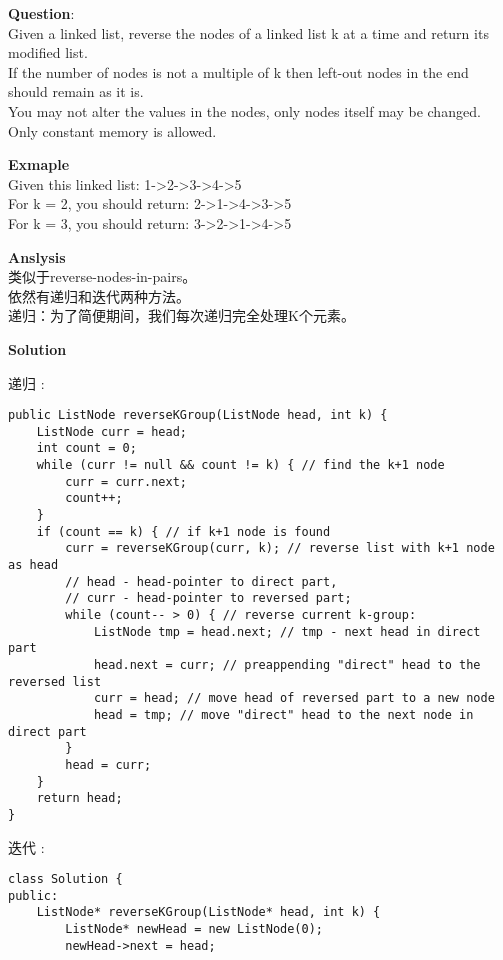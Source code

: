     
\begin{description}
    \item{\textbf{Question}}:\\%
		Given a linked list, reverse the nodes of a linked list k at a time and return its modified list.\\
		If the number of nodes is not a multiple of k then left-out nodes in the end should remain as it is.\\
		You may not alter the values in the nodes, only nodes itself may be changed.\\
		Only constant memory is allowed.

    \item{\textbf{Exmaple}}\\
		Given this linked list: 1->2->3->4->5\\
		For k = 2, you should return: 2->1->4->3->5\\
		For k = 3, you should return: 3->2->1->4->5

    \item{\textbf{Anslysis}}\\
		类似于reverse-nodes-in-pairs。\\
		依然有递归和迭代两种方法。\\
		递归：为了简便期间，我们每次递归完全处理K个元素。\\


    \item{\textbf{Solution}}
	\item{递归} : \\
		\begin{lstlisting}
public ListNode reverseKGroup(ListNode head, int k) {
    ListNode curr = head;
    int count = 0;
    while (curr != null && count != k) { // find the k+1 node
        curr = curr.next;
        count++;
    }
    if (count == k) { // if k+1 node is found
        curr = reverseKGroup(curr, k); // reverse list with k+1 node as head
        // head - head-pointer to direct part, 
        // curr - head-pointer to reversed part;
        while (count-- > 0) { // reverse current k-group: 
            ListNode tmp = head.next; // tmp - next head in direct part
            head.next = curr; // preappending "direct" head to the reversed list 
            curr = head; // move head of reversed part to a new node
            head = tmp; // move "direct" head to the next node in direct part
        }
        head = curr;
    }
    return head;
}
		\end{lstlisting}
	\item{迭代} : \\
		\begin{lstlisting}
class Solution {
public:
    ListNode* reverseKGroup(ListNode* head, int k) {
		ListNode* newHead = new ListNode(0);
		newHead->next = head;


\end{lstlisting}
\end{description}
